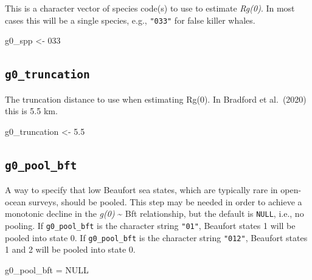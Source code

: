 \documentclass[
]{book}
\newenvironment{Shaded}{\begin{snugshade}}{\end{snugshade}}
\newcommand{\ConstantTok}[1]{\textcolor[rgb]{0.56,0.35,0.01}{#1}}
\newcommand{\FloatTok}[1]{\textcolor[rgb]{0.00,0.00,0.81}{#1}}
\newcommand{\NormalTok}[1]{#1}
\newcommand{\OtherTok}[1]{\textcolor[rgb]{0.56,0.35,0.01}{#1}}
\newcommand{\StringTok}[1]{\textcolor[rgb]{0.31,0.60,0.02}{#1}}
\begin{document}
This is a character vector of species code(s) to use to estimate \emph{Rg(0)}. In most cases this will be a single species, e.g., \texttt{"033"} for false killer whales.

\begin{Shaded}
\begin{Highlighting}[]
\NormalTok{g0\_spp }\OtherTok{\textless{}{-}} \StringTok{\textquotesingle{}033\textquotesingle{}}
\end{Highlighting}
\end{Shaded}

\hypertarget{g0_truncation}{%
\subsection*{\texorpdfstring{\texttt{g0\_truncation}}{g0\_truncation}}\label{g0_truncation}}

The truncation distance to use when estimating Rg(0). In Bradford et al.~(2020) this is 5.5 km.

\begin{Shaded}
\begin{Highlighting}[]
\NormalTok{g0\_truncation }\OtherTok{\textless{}{-}} \FloatTok{5.5}
\end{Highlighting}
\end{Shaded}

\hypertarget{g0_pool_bft}{%
\subsection*{\texorpdfstring{\texttt{g0\_pool\_bft}}{g0\_pool\_bft}}\label{g0_pool_bft}}

A way to specify that low Beaufort sea states, which are typically rare in open-ocean surveys, should be pooled. This step may be needed in order to achieve a monotonic decline in the \emph{g(0)} \textasciitilde{} Bft relationship, but the default is \texttt{NULL}, i.e., no pooling. If \texttt{g0\_pool\_bft} is the character string \texttt{"01"}, Beaufort states 1 will be pooled into state 0. If \texttt{g0\_pool\_bft} is the character string \texttt{"012"}, Beaufort states 1 and 2 will be pooled into state 0.

\begin{Shaded}
\begin{Highlighting}[]
\NormalTok{g0\_pool\_bft }\OtherTok{=} \ConstantTok{NULL}
\end{Highlighting}
\end{Shaded}
\end{document}
